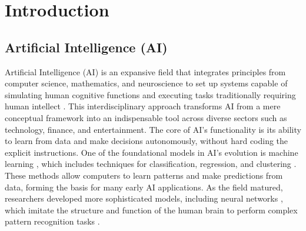 \documentclass[11pt,a4paper,oneside]{report}
\begin{document}

\clearpage
{}


\chapter{Introduction}
\label{introduction}

\section{Artificial Intelligence (AI)}
Artificial Intelligence (AI) is an expansive field that integrates principles from computer science, mathematics, and neuroscience to set up systems capable of simulating human cognitive functions and executing tasks traditionally requiring human intellect \cite{russell2010artificial}. 
This interdisciplinary approach transforms AI from a mere conceptual framework into an indispensable tool across diverse sectors such as technology, finance, and entertainment. 
The core of AI's functionality is its ability to learn from data and make decisions autonomously, without hard coding the explicit instructions. 
One of the foundational models in AI's evolution is machine learning \cite{jordan2015machine}, which includes techniques for classification, regression, and clustering \cite{huang2022large}. 
These methods allow computers to learn patterns and make predictions from data, forming the basis for many early AI applications. 
As the field matured, researchers developed more sophisticated models, including neural networks \cite{abiodun2018state}, which imitate the structure and function of the human brain to perform complex pattern recognition tasks \cite{schmidhuber2015deep}.
\end{document}
